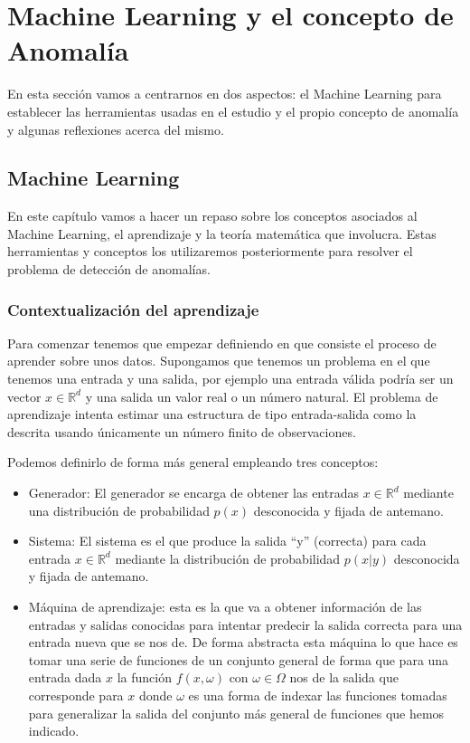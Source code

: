 \part{Machine Learning y el concepto de Anomalía}
\label{part:machineLearning_anomalia}

En esta sección vamos a centrarnos en dos aspectos: el Machine Learning para establecer las herramientas usadas en el estudio y el propio concepto de anomalía y algunas reflexiones acerca del mismo.

\chapter{Machine Learning}
\label{chapter:machine_learning}

En este capítulo vamos a hacer un repaso sobre los conceptos asociados al Machine Learning, el aprendizaje y la teoría matemática que involucra. Estas herramientas y conceptos los utilizaremos posteriormente para resolver el problema de detección de anomalías.

\section{Contextualización del aprendizaje}

Para comenzar tenemos que empezar definiendo en que consiste el proceso de aprender sobre unos datos. Supongamos que tenemos un problema en el que tenemos una entrada y una salida, por ejemplo una entrada válida podría ser un vector $x\in \mathbb{R}^d$ y una salida un valor real o un número natural. El problema de aprendizaje intenta estimar una estructura de tipo entrada-salida como la descrita usando únicamente un número finito de observaciones.

Podemos definirlo de forma más general empleando tres conceptos:

\begin{itemize}
	\item Generador: El generador se encarga de obtener las entradas $x\in \mathbb{R}^d$ mediante una distribución de probabilidad $p(x)$ desconocida y fijada de antemano.
	\item Sistema: El sistema es el que produce la salida ``y'' (correcta) para cada entrada $x\in \mathbb{R}^d$ mediante la distribución de probabilidad $p(x|y)$ desconocida y fijada de antemano.
	\item Máquina de aprendizaje: esta es la que va a obtener información de las entradas y salidas conocidas para intentar predecir la salida correcta para una entrada nueva que se nos de. De forma abstracta esta máquina lo que hace es tomar una serie de funciones de un conjunto general de forma que para una entrada dada $x$ la función $f(x,\omega)$ con $\omega \in \Omega$ nos de la salida que corresponde para $x$ donde $\omega$ es una forma de indexar las funciones tomadas para generalizar la salida del conjunto más general de funciones que hemos indicado.
\end{itemize}

